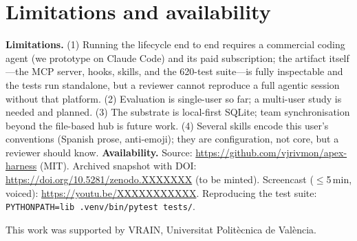 \documentclass[sigconf,review,anonymous=false]{acmart}
\begin{document}
\section{Limitations and availability}
\textbf{Limitations.} (1) Running the lifecycle end to end requires a commercial
coding agent (we prototype on Claude Code) and its paid subscription; the artifact
itself---the MCP server, hooks, skills, and the 620-test suite---is fully
inspectable and the tests run standalone, but a reviewer cannot reproduce a full
agentic session without that platform. (2) Evaluation is single-user so far; a
multi-user study is needed and planned. (3) The substrate is local-first SQLite;
team synchronisation beyond the file-based hub is future work. (4) Several skills
encode this user's conventions (Spanish prose, anti-emoji); they are configuration,
not core, but a reviewer should know.
\textbf{Availability.} Source: \url{https://github.com/vjrivmon/apex-harness}
(MIT). Archived snapshot with DOI: \url{https://doi.org/10.5281/zenodo.XXXXXXX}
(to be minted). Screencast (\(\leq\)5\,min, voiced): \url{https://youtu.be/XXXXXXXXXXX}.
Reproducing the test suite: \texttt{PYTHONPATH=lib .venv/bin/pytest tests/}.

\begin{acks}
This work was supported by VRAIN, Universitat Polit\`ecnica de Val\`encia.
\end{acks}



\end{document}
